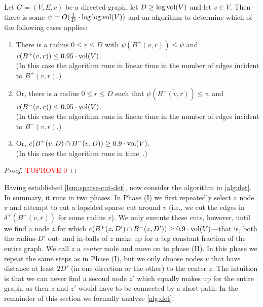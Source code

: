 \begin{lemma} \label{lem:sparse-cut-det}
Let $G = (V, E, c)$ be a directed graph, let $D \geq \log \operatorname{vol}(V)$ and let $v \in V$. Then there is some $\psi = O(\frac{1}{D} \cdot \log\log \operatorname{vol}(V))$ and an algorithm to determine which of the following cases applies:
\begin{enumerate}[label=(\roman*)]
	\item There is a radius $0 \leq r \leq D$ with $\psi(B^+(v, r)) \leq \psi$ and $c(B^+(v, r)) \leq 0.95 \cdot \operatorname{vol}(V)$.\\(In this case the algorithm runs in linear time in the number of edges incident to $B^+(v, r)$.)
	\item Or, there is a radius $0 \leq r \leq D$ such that $\psi(\overline{B^-(v, r)}) \leq \psi$ and $c(B^-(v, r)) \leq 0.95 \cdot \operatorname{vol}(V)$.\\(In this case the algorithm runs in linear time in the number of edges incident to $B^-(v, r)$.)
	\item Or, $c(B^+(v, D) \cap B^-(v, D)) \geq 0.9 \cdot \operatorname{vol}(V)$.\\(In this case the algorithm runs in time~.)
\end{enumerate}
\end{lemma}
\begin{proof}\textcolor{red}{TOPROVE 0}\end{proof}

Having established \cref{lem:sparse-cut-det}, now consider the algorithm in \cref{alg:det}. In summary, it runs in two phases. In Phase (I) we first repeatedly select a node $v$ and attempt to cut a lopsided sparse cut around $v$ (i.e., we cut the edges in $\delta^+(B^+(v, r))$ for some radius $r$). We only execute these cuts, however, until we find a node $z$ for which $c(B^+(z, D') \cap B^-(z, D')) \geq 0.9 \cdot \operatorname{vol}(V)$---that is, both the radius-$D'$ out- and in-balls of $z$ make up for a big constant fraction of the entire graph. We call $z$ a \emph{center} node and move on to phase (II). In this phase we repeat the same steps as in Phase (I), but we only choose nodes $v$ that have distance at least $2D'$ (in one direction or the other) to the center $z$. The intuition is that we can never find a second node $z'$ which equally makes up for the entire graph, as then $z$ and $z'$ would have to be connected by a short path. In the remainder of this section we formally analyze \cref{alg:det}.

